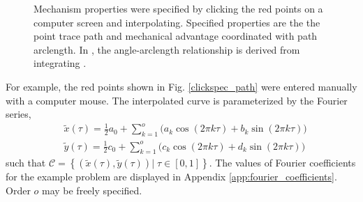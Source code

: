 \documentclass[journal]{IEEEtran}
\begin{document}
\begin{figure}[!t]
\caption{Mechanism properties were specified by clicking the red points on a computer screen and interpolating.  Specified properties are the \protect{} the point trace path and \protect{} mechanical advantage coordinated with path arclength.  In \protect{}, the angle-arclength relationship is derived from integrating \protect{}.}
\label{clickspec}
\end{figure}

For example, the red points shown in Fig. \ref{clickspec_path} were entered manually with a computer mouse.  The interpolated curve is parameterized by the Fourier series,
\begin{align}
&\tilde{x}(\tau) = \tfrac{1}{2}a_0 + \textstyle\sum\limits_{k=1}^{o}\!\Big( a_k\cos (2\pi k\tau) + b_k\sin (2\pi k\tau) \Big) \nonumber\\[5pt]
&\tilde{y}(\tau) = \tfrac{1}{2}c_0 + \textstyle\sum\limits_{k=1}^{o}\!\Big( c_k\cos (2\pi k\tau) + d_k\sin (2\pi k\tau) \Big)
\label{fourier_interp_path}
\end{align}
such that $\mathcal{C} = \left\lbrace \left( \tilde{x}(\tau), \tilde{y}(\tau) \right) |\; \tau \in [0,1] \right\rbrace$.
The values of Fourier coefficients for the example problem are displayed in Appendix \ref{app:fourier_coefficients}.
Order $o$ may be freely specified.
\end{document}

